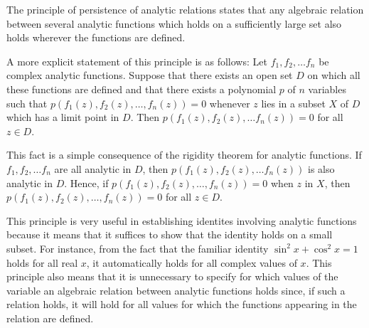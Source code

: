 \documentclass[12pt]{article}
\begin{document}
The principle of persistence of analytic relations states that any algebraic relation between several analytic functions which holds on a sufficiently large set also holds wherever the functions are defined.

A more explicit statement of this principle is as follows:  Let $f_1, f_2, \ldots f_n$ be complex analytic functions.  Suppose that there exists an open set $D$ on which all these functions are defined and that there exists a polynomial $p$ of $n$ variables such that $p(f_1(z), f_2 (z), \ldots, f_n(z)) = 0$ whenever $z$ lies in a subset $X$ of $D$ which has a limit point in $D$.  Then $p (f_1 (z), f_2 (z), \ldots f_n (z)) = 0$ for all $z \in D$.  

This fact is a simple consequence of the rigidity theorem for analytic functions.  If $f_1, f_2, \ldots f_n$ are all analytic in $D$, then $p (f_1 (z), f_2 (z), \ldots f_n (z))$ is also analytic in $D$.  Hence, if $p (f_1 (z), f_2 (z), \ldots,  f_n (z)) = 0$ when $z$ in $X$, then $p (f_1 (z), f_2 (z), \ldots,  f_n (z)) = 0$ for all $z \in D$.

This principle is very useful in establishing identites involving analytic functions because it means that it suffices to show that the identity holds on a small subset.  For instance, from the fact that the familiar identity $\sin^2 x + \cos^2 x = 1$ holds for all real $x$, it automatically holds for all complex values of $x$.  This principle also means that it is unnecessary to specify for which values of the variable an algebraic relation between analytic functions holds since, if such a relation holds, it will hold for all values for which the functions appearing in the relation are defined.
\end{document}
